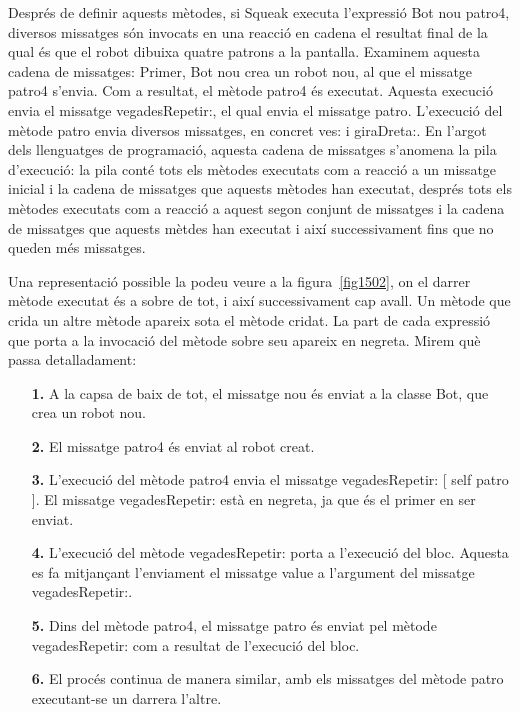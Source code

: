 Després de definir aquests mètodes, si Squeak executa l'expressió \textsf{Bot nou patro4}, diversos missatges són invocats en una reacció en cadena el resultat final de la qual és que el robot dibuixa quatre patrons a la pantalla. Examinem aquesta cadena de missatges: Primer, \textsf{Bot nou} crea un robot nou, al que el missatge \textsf{patro4} s'envia. Com a resultat, el mètode \textsf{patro4} és executat. Aquesta execució envia el missatge \textsf{vegadesRepetir:}, el qual envia el missatge \textsf{patro}. L'execució del mètode \textsf{patro} envia diversos missatges, en concret \textsf{ves:} i \textsf{giraDreta:}. En l'argot dels llenguatges de programació, aquesta cadena de missatges s'anomena la pila d'execució: la pila conté tots els mètodes executats com a reacció a un missatge inicial i la cadena de missatges que aquests mètodes han executat, després tots els mètodes executats com a reacció a aquest segon conjunt de missatges i la cadena de missatges que aquests mètdes han executat i així successivament fins que no queden més missatges. 

Una representació possible la podeu veure a la figura~\ref{fig1502}, on el darrer mètode executat és a sobre de tot, i així successivament cap avall. Un mètode que crida un altre mètode apareix sota el mètode cridat. La part de cada expressió que porta a la invocació del mètode sobre seu apareix en negreta. Mirem què passa detalladament:
\begin{itemize}
\item[\textbf{1.}] A la capsa de baix de tot, el missatge \textsf{nou} és enviat a la classe \textsf{Bot}, que crea un robot nou.
\item[\textbf{2.}] El missatge \textsf{patro4} és enviat al robot creat.
\item[\textbf{3.}] L'execució del mètode \textsf{patro4} envia el missatge \textsf{vegadesRepetir: [ self patro ]}. El missatge \textsf{vegadesRepetir:} està en negreta, ja que és el primer en ser enviat.
\item[\textbf{4.}] L'execució del mètode \textsf{vegadesRepetir:} porta a l'execució del bloc. Aquesta es fa mitjançant l'enviament el missatge \textsf{value} a l'argument del missatge \textsf{vegadesRepetir:}.
\item[\textbf{5.}] Dins del mètode \textsf{patro4}, el missatge \textsf{patro} és enviat pel mètode \textsf{vegadesRepetir:} com a resultat de l'execució del bloc.
\item[\textbf{6.}] El procés continua de manera similar, amb els missatges del mètode \textsf{patro} executant-se un darrera l'altre.
\end{itemize}

